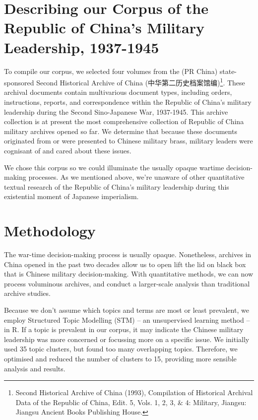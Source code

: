 \documentclass[12pt,letterpaper]{article}
\begin{document}
\begin{CJK*}{UTF8}{gbsn}
		\section*{Describing our Corpus of the Republic of China's Military Leadership, 1937-1945}
		\vspace{.1cm}
		To compile our corpus, we selected four volumes from the (PR China) state-sponsored Second Historical Archive of China (中华第二历史档案馆编)\footnote{Second Historical Archive of China (1993), Compilation of Historical Archival Data of the Republic of China, Edit. 5, Vols. 1, 2, 3, $\&$ 4: Military, Jiangsu: Jiangsu Ancient Books Publishing House.}. These archival documents contain multivarious document types, including orders, instructions, reports, and correspondence within the Republic of China’s military leadership during the Second Sino-Japanese War, 1937-1945. This archive collection is at present the most comprehensive collection of Republic of China military archives opened so far. We determine that because these documents originated from or were presented to Chinese military brass, military leaders were cognisant of and cared about these issues.
		
		\vspace{.35cm}
		
		\noindent We chose this corpus so we could illuminate the usually opaque wartime decision-making processes. As we mentioned above, we’re unaware of other quantitative textual research of the Republic of China’s military leadership during this existential moment of Japanese imperialism. 
		\vspace{.5cm}
		\maketitle
		\section*{Methodology}
		\vspace{.1cm}
		The war-time decision-making process is usually opaque. Nonetheless, archives in China opened in the past two decades allow us to open lift the lid on black box that is Chinese military decision-making. With quantitative methods, we can now process voluminous archives, and conduct a larger-scale analysis than traditional archive studies. 
		
		\vspace{.35cm}
		
		\noindent Because we don’t assume which topics and terms are most or least prevalent, we employ Structured Topic Modelling (STM) – an unsupervised learning method – in R. If a topic is prevalent in our corpus, it may indicate the Chinese military leadership was more concerned or focussing more on a specific issue. We initially used 35 topic clusters, but found too many overlapping topics. Therefore, we optimised and reduced the number of clusters to 15, providing more sensible analysis and results.  
		\vspace{.5cm}
		\maketitle

\end{CJK*}
\end{document}
